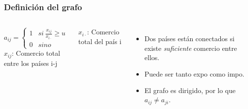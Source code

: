 \documentclass[compress]{beamer}
\begin{document}
		\begin{frame}
\frametitle{Definición del grafo}

\begin{columns}[t]
	
	$$
	a_{ij} = 
	\begin{cases} 
	1 & si \ \frac{x_{ij}}{x_{i\cdot}}\geq u \\
	0 & sino 
	\end{cases}
	$$
	$x_{ij}$: Comercio total entre los países i-j \par
	$x_{i\cdot}$: Comercio total del país i
	
	
	\begin{itemize}[label=\faRebel]
		\item Dos países están conectados si existe \textit{suficiente} comercio entre ellos.
		\item Puede ser tanto expo como impo.
		\item El grafo es dirigido, por lo que $a_{ij} \neq a_{ji}$.
	\end{itemize}
	
\end{columns}

\end{frame}
\end{document}
